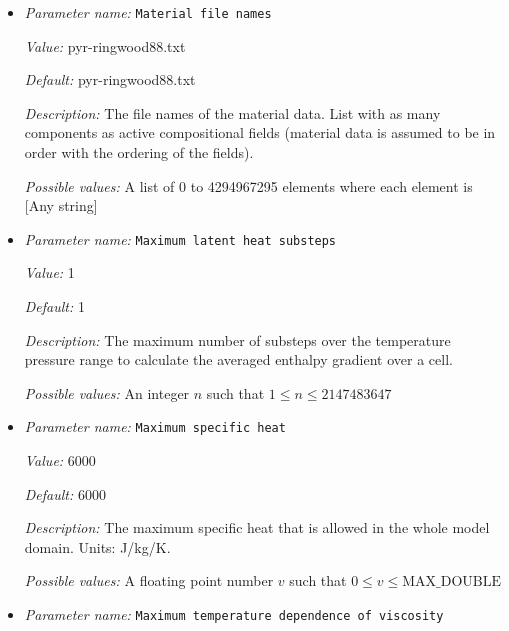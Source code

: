 \begin{itemize}
{\it Default:} perplex


{\it Description:} The material file format to be read in the property tables.


{\it Possible values:} Any one of perplex, hefesto
\item {\it Parameter name:} {\tt Material file names}
\label{parameters:Material model/Grain size model/Material file names}


{\it Value:} pyr-ringwood88.txt


{\it Default:} pyr-ringwood88.txt


{\it Description:} The file names of the material data. List with as many components as active compositional fields (material data is assumed to be in order with the ordering of the fields). 


{\it Possible values:} A list of 0 to 4294967295 elements where each element is [Any string]
\item {\it Parameter name:} {\tt Maximum latent heat substeps}
\label{parameters:Material model/Grain size model/Maximum latent heat substeps}


{\it Value:} 1


{\it Default:} 1


{\it Description:} The maximum number of substeps over the temperature pressure range to calculate the averaged enthalpy gradient over a cell.


{\it Possible values:} An integer $n$ such that $1\leq n \leq 2147483647$
\item {\it Parameter name:} {\tt Maximum specific heat}
\label{parameters:Material model/Grain size model/Maximum specific heat}


{\it Value:} 6000


{\it Default:} 6000


{\it Description:} The maximum specific heat that is allowed in the whole model domain. Units: J/kg/K.


{\it Possible values:} A floating point number $v$ such that $0 \leq v \leq \text{MAX\_DOUBLE}$
\item {\it Parameter name:} {\tt Maximum temperature dependence of viscosity}
\label{parameters:Material model/Grain size model/Maximum temperature dependence of viscosity}



\end{itemize}
